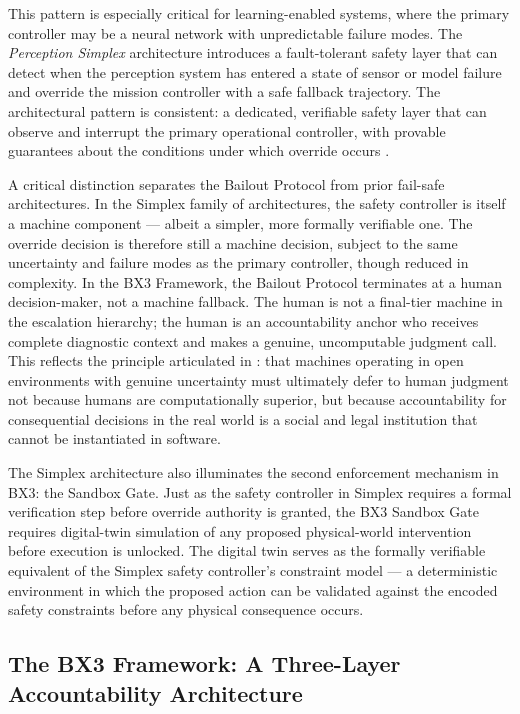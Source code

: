 This pattern is especially critical for learning-enabled systems, where the primary controller may be a neural network with unpredictable failure modes. The \textit{Perception Simplex} architecture introduces a fault-tolerant safety layer that can detect when the perception system has entered a state of sensor or model failure and override the mission controller with a safe fallback trajectory. The architectural pattern is consistent: a dedicated, verifiable safety layer that can observe and interrupt the primary operational controller, with provable guarantees about the conditions under which override occurs \cite{bansal2019}.

A critical distinction separates the Bailout Protocol from prior fail-safe architectures. In the Simplex family of architectures, the safety controller is itself a machine component --- albeit a simpler, more formally verifiable one. The override decision is therefore still a machine decision, subject to the same uncertainty and failure modes as the primary controller, though reduced in complexity. In the BX3 Framework, the Bailout Protocol terminates at a human decision-maker, not a machine fallback. The human is not a final-tier machine in the escalation hierarchy; the human is an accountability anchor who receives complete diagnostic context and makes a genuine, uncomputable judgment call. This reflects the principle articulated in \cite{wiener1948}: that machines operating in open environments with genuine uncertainty must ultimately defer to human judgment not because humans are computationally superior, but because accountability for consequential decisions in the real world is a social and legal institution that cannot be instantiated in software.

The Simplex architecture also illuminates the second enforcement mechanism in BX3: the Sandbox Gate. Just as the safety controller in Simplex requires a formal verification step before override authority is granted, the BX3 Sandbox Gate requires digital-twin simulation of any proposed physical-world intervention before execution is unlocked. The digital twin serves as the formally verifiable equivalent of the Simplex safety controller's constraint model --- a deterministic environment in which the proposed action can be validated against the encoded safety constraints before any physical consequence occurs.

\subsection{The BX3 Framework: A Three-Layer Accountability Architecture}

